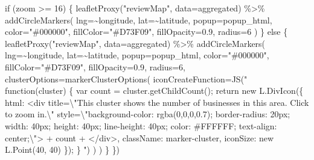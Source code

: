 \documentclass[
  12pt,
  letterpaper,
  DIV=11,
  numbers=noendperiod]{scrartcl}
\newenvironment{Shaded}{\begin{snugshade}}{\end{snugshade}}
\newcommand{\AttributeTok}[1]{\textcolor[rgb]{0.98,0.46,0.51}{#1}}
\newcommand{\ControlFlowTok}[1]{\textcolor[rgb]{0.98,0.46,0.51}{#1}}
\newcommand{\DecValTok}[1]{\textcolor[rgb]{0.47,0.72,1.00}{#1}}
\newcommand{\FloatTok}[1]{\textcolor[rgb]{0.47,0.72,1.00}{#1}}
\newcommand{\FunctionTok}[1]{\textcolor[rgb]{0.70,0.57,0.94}{#1}}
\newcommand{\NormalTok}[1]{\textcolor[rgb]{0.88,0.89,0.91}{#1}}
\newcommand{\SpecialCharTok}[1]{\textcolor[rgb]{0.47,0.72,1.00}{#1}}
\newcommand{\StringTok}[1]{\textcolor[rgb]{0.62,0.80,1.00}{#1}}
\begin{document}
\begin{Shaded}
\begin{Highlighting}[]
    \ControlFlowTok{if}\NormalTok{ (zoom }\SpecialCharTok{\textgreater{}=} \DecValTok{16}\NormalTok{) \{}
      \FunctionTok{leafletProxy}\NormalTok{(}\StringTok{"reviewMap"}\NormalTok{, }\AttributeTok{data=}\NormalTok{aggregated) }\SpecialCharTok{\%\textgreater{}\%}
        \FunctionTok{addCircleMarkers}\NormalTok{(}
          \AttributeTok{lng=}\SpecialCharTok{\textasciitilde{}}\NormalTok{longitude, }\AttributeTok{lat=}\SpecialCharTok{\textasciitilde{}}\NormalTok{latitude,}
          \AttributeTok{popup=}\NormalTok{popup\_html,}
          \AttributeTok{color=}\StringTok{"\#000000"}\NormalTok{,}
          \AttributeTok{fillColor=}\StringTok{"\#D73F09"}\NormalTok{,}
          \AttributeTok{fillOpacity=}\FloatTok{0.9}\NormalTok{,}
          \AttributeTok{radius=}\DecValTok{6}
\NormalTok{        )}
\NormalTok{    \} }\ControlFlowTok{else}\NormalTok{ \{}
      \FunctionTok{leafletProxy}\NormalTok{(}\StringTok{"reviewMap"}\NormalTok{, }\AttributeTok{data=}\NormalTok{aggregated) }\SpecialCharTok{\%\textgreater{}\%}
        \FunctionTok{addCircleMarkers}\NormalTok{(}
          \AttributeTok{lng=}\SpecialCharTok{\textasciitilde{}}\NormalTok{longitude, }\AttributeTok{lat=}\SpecialCharTok{\textasciitilde{}}\NormalTok{latitude,}
          \AttributeTok{popup=}\NormalTok{popup\_html,}
          \AttributeTok{color=}\StringTok{"\#000000"}\NormalTok{,}
          \AttributeTok{fillColor=}\StringTok{"\#D73F09"}\NormalTok{,}
          \AttributeTok{fillOpacity=}\FloatTok{0.9}\NormalTok{,}
          \AttributeTok{radius=}\DecValTok{6}\NormalTok{,}
          \AttributeTok{clusterOptions=}\FunctionTok{markerClusterOptions}\NormalTok{(}
            \AttributeTok{iconCreateFunction=}\FunctionTok{JS}\NormalTok{(}\StringTok{"}
\StringTok{              function(cluster) \{}
\StringTok{                var count = cluster.getChildCount();}
\StringTok{                return new L.DivIcon(\{}
\StringTok{                  html: \textquotesingle{}\textless{}div title=}\SpecialCharTok{\textbackslash{}"}\StringTok{This cluster shows the number of businesses in this area. Click to zoom in.}\SpecialCharTok{\textbackslash{}"}\StringTok{ style=}\SpecialCharTok{\textbackslash{}"}\StringTok{background{-}color: rgba(0,0,0,0.7); border{-}radius: 20px; width: 40px; height: 40px; line{-}height: 40px; color: \#FFFFFF; text{-}align: center;}\SpecialCharTok{\textbackslash{}"}\StringTok{\textgreater{}\textquotesingle{} + count + \textquotesingle{}\textless{}/div\textgreater{}\textquotesingle{},}
\StringTok{                  className: \textquotesingle{}marker{-}cluster\textquotesingle{}, iconSize: new L.Point(40, 40)}
\StringTok{                \});}
\StringTok{              \}}
\StringTok{            "}\NormalTok{)}
\NormalTok{          )}
\NormalTok{        )}
\NormalTok{    \}}
\NormalTok{  \})}
  

\end{Highlighting}
\end{Shaded}
\end{document}

